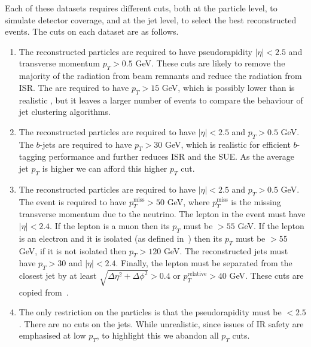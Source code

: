     Each of these datasets requires different cuts, both at the particle level, to simulate detector coverage, and at the jet level, to select the best reconstructed events.
    The cuts on each dataset are as follows.
    \begin{enumerate}
        \item The reconstructed particles are required to have
            pseudorapidity \(|\eta|< 2.5\) and transverse momentum \(p_T > 0.5\) GeV.
            These cuts are likely to remove the majority of the radiation from beam remnants
            and reduce the radiation from ISR.
            The  are required to have \(p_T > 15\) GeV, which is possibly lower than is realistic \cite{Chakraborty:2020vwj},
            but it leaves a larger number of events to compare the behaviour of jet clustering algorithms.

        \item  The reconstructed particles are required to have
             \(|\eta|< 2.5\) and \(p_T > 0.5\) GeV.
            The $b$-jets are required to have \(p_T > 30\) GeV, which is realistic for efficient $b$-tagging performance and further reduces ISR and the SUE.
            As the average jet \(p_T\) is higher we can afford this higher \(p_T\) cut.
            
        \item The reconstructed particles are required to have
             \(|\eta|< 2.5\) and \(p_T > 0.5\) GeV.
            The event is required to have  \(p_{T}^{\text{miss}} > 50\) GeV,
            where \(p_{T}^{\text{miss}}\) is the missing transverse momentum due to 
            the neutrino.
            The lepton in the event must have  \(|\eta|< 2.4\).
            If the lepton  is a muon then its \(p_T\) must be \(>  55\) GeV.
            If the lepton  is an electron and it is isolated (as defined in~\cite{Sirunyan:2018fpa}) then its \(p_T\) must be \(> 55\) GeV, if it is not isolated then \(p_T > 120\) GeV.
            The reconstructed jets must have \(p_T > 30\) and \(|\eta|< 2.4\).
            Finally, the lepton must be separated from the closest jet by at least
            \(\sqrt{\Delta\eta^2 + \Delta \phi^2} > 0.4\) or
            \(p_{T}^{\text{relative}} > 40\) GeV.
            These cuts are copied from~\cite{Sirunyan:2019rfa}.
        \item The only restriction on the particles is that the pseudorapidity must be \(< 2.5\).
            There are no cuts on the jets. While unrealistic, since 
            issues of IR safety are emphasised at low \(p_T\),  to highlight this we abandon all \(p_T\) cuts.

    \end{enumerate}


